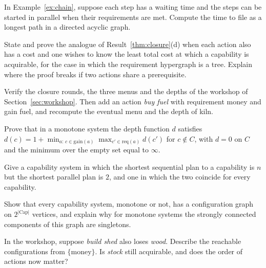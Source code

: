 \begin{exercise}
In Example~\ref{ex:chain}, suppose each step has a waiting time and the steps can be started in parallel when their requirements are met. Compute the time to file as a longest path in a directed acyclic graph.
\end{exercise}

\begin{exercise}
State and prove the analogue of Result~\ref{thm:closure}(d) when each action also has a cost and one wishes to know the least total cost at which a capability is acquirable, for the case in which the requirement hypergraph is a tree. Explain where the proof breaks if two actions share a prerequisite.
\end{exercise}

\begin{exercise}
Verify the closure rounds, the three menus and the depths of the workshop of Section~\ref{sec:workshop}. Then add an action \emph{buy fuel} with requirement money and gain fuel, and recompute the eventual menu and the depth of kiln.
\end{exercise}

\begin{exercise}
Prove that in a monotone system the depth function $d$ satisfies $d(c)=1+\min_{a:\,c\in\mathrm{gain}(a)}\max_{c'\in\mathrm{req}(a)}d(c')$ for $c\notin C$, with $d=0$ on $C$ and the minimum over the empty set equal to $\infty$.\label{ex2:depth-formula}
\end{exercise}

\begin{exercise}
Give a capability system in which the shortest sequential plan to a capability is $n$ but the shortest parallel plan is $2$, and one in which the two coincide for every capability.
\end{exercise}

\begin{exercise}
Show that every capability system, monotone or not, has a configuration graph on $2^{|\mathrm{Cap}|}$ vertices, and explain why for monotone systems the strongly connected components of this graph are singletons.\label{ex2:config-graph}
\end{exercise}

\begin{exercise}
In the workshop, suppose \emph{build shed} also loses \emph{wood}. Describe the reachable configurations from $\{\mathrm{money}\}$. Is \emph{stock} still acquirable, and does the order of actions now matter?
\end{exercise}

